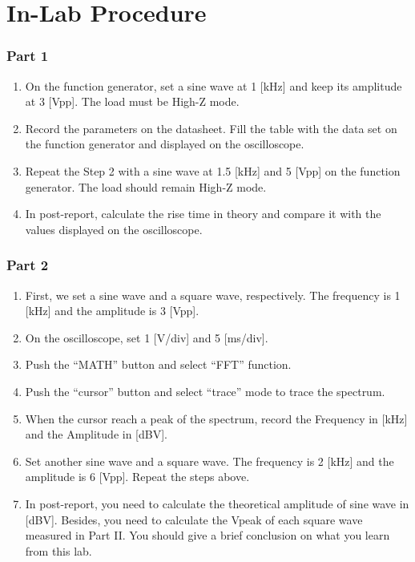 \documentclass{article}
\begin{document}
\section{In-Lab Procedure}

\subsubsection{Part 1}

\begin{enumerate}
\item
On the function generator, set a sine wave at 1 [kHz] and keep its amplitude
at 3 [Vpp]. The load must be High-Z mode.
\item
Record the parameters on the datasheet. Fill the table with the data set on the
function generator and displayed on the oscilloscope.
\item
Repeat the Step 2 with a sine wave at 1.5 [kHz] and 5 [Vpp] on the function
generator. The load should remain High-Z mode.
\item
In post-report, calculate the rise time in theory and compare it with the values
displayed on the oscilloscope.
\end{enumerate}

\subsubsection{Part 2}

\begin{enumerate}
\item
First, we set a sine wave and a square wave, respectively. The frequency is 1
[kHz] and the amplitude is 3 [Vpp].
\item
On the oscilloscope, set 1 [V/div] and 5 [ms/div].
\item
Push the “MATH” button and select “FFT” function.
\item
Push the “cursor” button and select “trace” mode to trace the spectrum.
\item
When the cursor reach a peak of the spectrum, record the Frequency in [kHz]
and the Amplitude in [dBV].
\item
Set another sine wave and a square wave. The frequency is 2 [kHz] and the
amplitude is 6 [Vpp]. Repeat the steps above.
\item
In post-report, you need to calculate the theoretical amplitude of sine wave in
[dBV]. Besides, you need to calculate the Vpeak of each square wave
measured in Part II. You should give a brief conclusion on what you learn
from this lab.
\end{enumerate}
\end{document}
